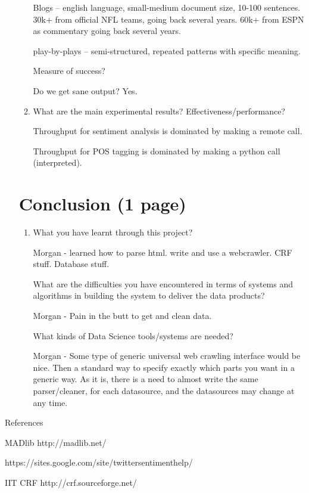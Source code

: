 \documentclass{article}
\begin{document}
\begin{enumerate}
\begin{enumerate}
    Blogs -- english language, small-medium document size, 10-100 sentences.
    30k+ from official NFL teams, going back several years.
    60k+ from ESPN as commentary going back several years.

    play-by-plays -- semi-structured, repeated patterns with specific meaning.


    Measure of success?

    Do we get sane output? Yes.

  \item What are the main experimental results? Effectiveness/performance?

    Throughput for sentiment analysis is dominated by making a remote call.

    Throughput for POS tagging is dominated by making a python call (interpreted).

  \end{enumerate}

  \section{Conclusion (1 page)}
  \begin{enumerate}\item What you have learnt through this project?

    Morgan - learned how to parse html. write and use a webcrawler. CRF stuff. Database stuff.

    What are the difficulties you have encountered in terms of systems and algorithms in building the system to deliver the data products?

    Morgan - Pain in the butt to get and clean data.

    What kinds of Data Science tools/systems are needed?

    Morgan -
    Some type of generic universal web crawling interface would be nice.
    Then a standard way to specify exactly which parts you want in a generic way.
    As it is, there is a need to almost write the same parser/cleaner, for each datasource, and the datasources may change at any time.


  \end{enumerate}
\end{enumerate}

References

MADlib http://madlib.net/

https://sites.google.com/site/twittersentimenthelp/

IIT CRF http://crf.sourceforge.net/
\end{document}
